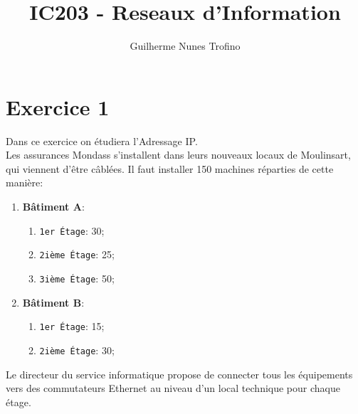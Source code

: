 \documentclass{article}
\title{IC203 - Reseaux d'Information}
\author{Guilherme Nunes Trofino}
\begin{document}
\maketitle
\setlength{\parindent}{0pt}

\newcommand{\adressTable}[7]{
    \begin{table}[H]
        \centering\begin{tabular}{c|ll}
            \multirow{5}{*}{#1} & 193.215.124.#2/#7 & sous-réseau\\
            \cline{2-3}
            & 193.215.124.#3 & \multirow{2}{*}{adresses disponibles}\\
            & 193.215.124.#4 &\\
            \cline{2-3}
            & 193.215.124.#5 & broadcast\\
            \cline{2-3}
            & 255.255.255.#6 & netmask\\
        \end{tabular}
    \end{table}
}



\section*{Exercice 1}
\noindent Dans ce exercice on étudiera l'Adressage IP.\\

Les assurances Mondass s'installent dans leurs nouveaux locaux de Moulinsart, qui viennent d'être câblées. Il faut installer 150 machines réparties de cette manière:
\begin{enumerate}
    \item \textbf{Bâtiment A}:
    \begin{enumerate}[noitemsep]
        \item \texttt{1er Étage}: 30;
        \item \texttt{2ième Étage}: 25;
        \item \texttt{3ième Étage}: 50;
    \end{enumerate}
    
    \item \textbf{Bâtiment B}:
    \begin{enumerate}[noitemsep]
        \item \texttt{1er Étage}: 15;
        \item \texttt{2ième Étage}: 30;
    \end{enumerate}
\end{enumerate}
Le directeur du service informatique propose de connecter tous les équipements vers des commutateurs Ethernet au niveau d'un local technique pour chaque étage.\\
\end{document}
